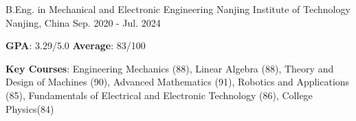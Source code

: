 

\begin{cventries}
  
  \cventry
    {B.Eng. in Mechanical and Electronic Engineering} %
    {Nanjing Institute of Technology} %
    {Nanjing, China} %
    {Sep. 2020 - Jul. 2024} %
    {
      \begin{cvitems} %
        \item {\textbf{GPA}: 3.29/5.0  \quad    \textbf{Average}: 83/100}
        \item {\textbf{Key Courses}: Engineering Mechanics (88), Linear Algebra (88), Theory and Design of Machines (90), Advanced Mathematics (91), Robotics and Applications (85), Fundamentals of Electrical and Electronic Technology (86), College Physics(84)}
      \end{cvitems}
    }
\end{cventries}
